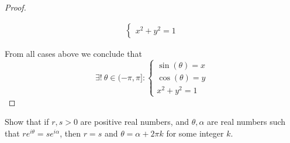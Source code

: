 \begin{proof}
\begin{itemize}
\begin{align*}
\begin{cases}
                                                          x^2 + y^2 = 1
                                                        \end{cases}
          \end{align*}
  \end{itemize}
  From all cases above we conclude that
  \[
    \exists!\ \theta \in (-\pi, \pi] : \begin{cases}
      \sin(\theta) = x \\
      \cos(\theta) = y \\
      x^2 + y^2 = 1
    \end{cases}
  \]
\end{proof}

\begin{ex}\label{ex:4.7.5}
  Show that if \(r, s > 0\) are positive real numbers, and \(\theta, \alpha\) are real numbers such that \(r e^{i \theta} = s e^{i \alpha}\), then \(r = s\) and \(\theta = \alpha + 2 \pi k\) for some integer \(k\).
\end{ex}

